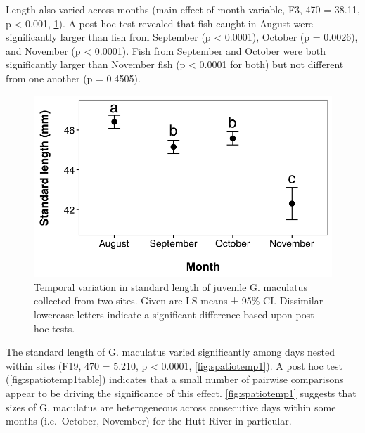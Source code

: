 \documentclass[]{book}
\begin{document}
Length also varied across months (main effect of month variable, F3, 470
= 38.11, p \textless{} 0.001, \ref{fig:stdlengthmonth}). A post hoc test
revealed that fish caught in August were significantly larger than fish
from September (p \textless{} 0.0001), October (p = 0.0026), and
November (p \textless{} 0.0001). Fish from September and October were
both significantly larger than November fish (p \textless{} 0.0001 for
both) but not different from one another (p = 0.4505).

\begin{figure}
\centering
\includegraphics{images/stdlengthmonth.png}
\caption{\label{fig:stdlengthmonth}Temporal variation in standard length of
juvenile G. maculatus collected from two sites. Given are LS means ±
95\% CI. Dissimilar lowercase letters indicate a significant difference
based upon post hoc tests.}
\end{figure}

The standard length of G. maculatus varied significantly among days
nested within sites (F19, 470 = 5.210, p \textless{} 0.0001,
\ref{fig:spatiotemp1}). A post hoc test (\ref{fig:spatiotemp1table})
indicates that a small number of pairwise comparisons appear to be
driving the significance of this effect. \ref{fig:spatiotemp1} suggests
that sizes of G. maculatus are heterogeneous across consecutive days
within some months (i.e.~October, November) for the Hutt River in
particular.
\end{document}
